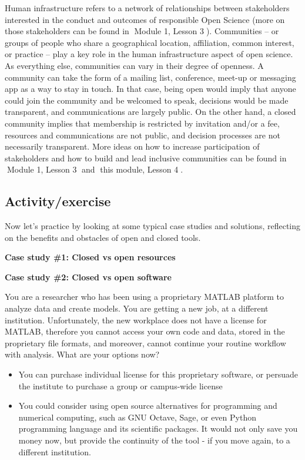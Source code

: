 \documentclass[
  letterpaper,
  DIV=11,
  numbers=noendperiod]{scrreport}
\providecommand{\tightlist}{%
  \setlength{\itemsep}{0pt}\setlength{\parskip}{0pt}}\usepackage{longtable,booktabs,array}
\begin{document}
Human infrastructure refers to a network of relationships between
stakeholders interested in the conduct and outcomes of responsible Open
Science (more on those stakeholders can be found in 🔗Module 1, Lesson
3🔗). Communities -- or groups of people who share a geographical
location, affiliation, common interest, or practice -- play a key role
in the human infrastructure aspect of open science. As everything else,
communities can vary in their degree of openness. A community can take
the form of a mailing list, conference, meet-up or messaging app as a
way to stay in touch. In that case, being open would imply that anyone
could join the community and be welcomed to speak, decisions would be
made transparent, and communications are largely public. On the other
hand, a closed community implies that membership is restricted by
invitation and/or a fee, resources and communications are not public,
and decision processes are not necessarily transparent. More ideas on
how to increase participation of stakeholders and how to build and lead
inclusive communities can be found in 🔗Module 1, Lesson 3🔗 and 🔗this
module, Lesson 4🔗.

\hypertarget{activityexercise-1}{%
\subsection*{Activity/exercise}\label{activityexercise-1}}

Now let's practice by looking at some typical case studies and
solutions, reflecting on the benefits and obstacles of open and closed
tools.

\textbf{Case study \#1: Closed vs open resources}

\textbf{Case study \#2: Closed vs open software}

You are a researcher who has been using a proprietary MATLAB platform to
analyze data and create models. You are getting a new job, at a
different institution. Unfortunately, the new workplace does not have a
license for MATLAB, therefore you cannot access your own code and data,
stored in the proprietary file formats, and moreover, cannot continue
your routine workflow with analysis. What are your options now?

\begin{itemize}
\tightlist
\item
  You can purchase individual license for this proprietary software, or
  persuade the institute to purchase a group or campus-wide license
\item
  You could consider using open source alternatives for programming and
  numerical computing, such as GNU Octave, Sage, or even Python
  programming language and its scientific packages. It would not only
  save you money now, but provide the continuity of the tool - if you
  move again, to a different institution.
\end{itemize}
\end{document}
